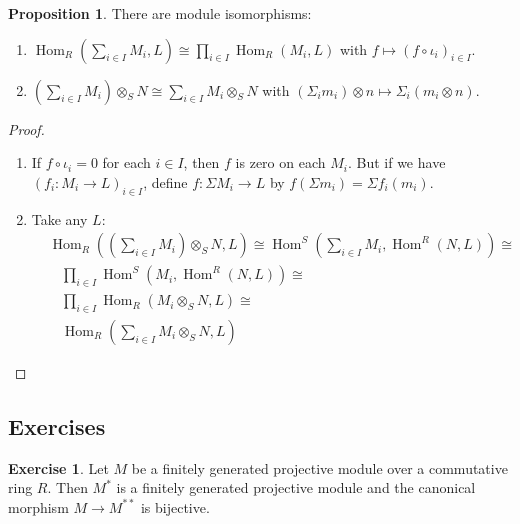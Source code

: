 \documentclass[8pt]{article}
\theoremstyle{definition}
\theoremstyle{definition}
\theoremstyle{definition}
\theoremstyle{definition}
\theoremstyle{definition}
\theoremstyle{definition}
\theoremstyle{definition}
\newtheorem{prop}{Proposition}[section]
\theoremstyle{definition}
\theoremstyle{definition}
\theoremstyle{definition}
\theoremstyle{definition}
\theoremstyle{definition}
\theoremstyle{definition}
\newtheorem{exercise}{Exercise}[section]
\theoremstyle{definition}
\theoremstyle{question}
\begin{document}
\begin{prop}
  There are module isomorphisms:
  \begin{enumerate}
    \item $\operatorname{Hom}_R(\sum \limits_{i \in I} M_i, L) \cong \prod \limits_{i \in I} \operatorname{Hom}_R(M_i, L)$
    with $f \mapsto (f \circ \iota_i)_{i \in I}$.
    \item $(\sum \limits_{i \in I} M_i) \otimes_S N \cong \sum \limits_{i \in I} M_i \otimes_S N$
    with $(\Sigma_i m_i) \otimes n \mapsto \Sigma_i (m_i \otimes n)$.
  \end{enumerate}
\end{prop}

\begin{proof}
  $ $

  \begin{enumerate}
    \item If $f \circ \iota_i = 0$ for each $i \in I$, then $f$ is zero on each $M_i$.
    But if we have $(f_i : M_i \to L)_{i \in I}$, define $f : \Sigma M_i \to L$
    by $f(\Sigma m_i) = \Sigma f_i(m_i)$.
    \item Take any $L$:
    \[
    \begin{array}{lll}
      & \operatorname{Hom}_R ((\sum \limits_{i \in I} M_i) \otimes_S N,L) \cong \operatorname{Hom}^S(\sum \limits_{i \in I} M_i, \operatorname{Hom}^R(N, L)) \cong & \\
      & \:\:\:\: \prod \limits_{i \in I} \operatorname{Hom}^S (M_i, \operatorname{Hom}^R(N, L)) \cong & \\
      & \:\:\:\: \prod \limits_{i \in I} \operatorname{Hom}_R (M_i \otimes_S N, L) \cong & \\
      & \:\:\:\: \operatorname{Hom}_R (\sum \limits_{i \in I} M_i \otimes_S N, L) &
    \end{array}
    \]
  \end{enumerate}
\end{proof}

\subsection{Exercises}

\begin{exercise}
Let $M$ be a finitely generated projective module over a commutative ring $R$. Then $M^*$ is a 
finitely generated projective module and the canonical morphism $M \to M^{**}$ is bijective.
\end{exercise}
\end{document}
